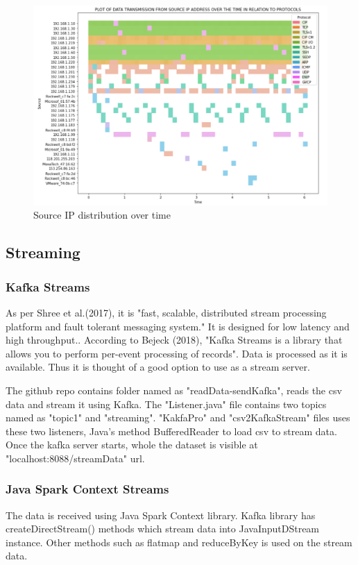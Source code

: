\documentclass{article}
\begin{document}
\begin{figure}[h!]
\centering
\includegraphics[scale=0.55]{source_time.PNG}
\caption{Source IP distribution over time}
\label{fig:universe}
\end{figure}

\subsection{Streaming}

\subsubsection{Kafka Streams}

As per Shree et al.(2017), it is "fast, scalable, distributed stream processing platform and fault tolerant messaging system." It is designed for low latency and high throughput.\cite{shree}. According to Bejeck (2018), "Kafka Streams is a library that allows you to perform per-event processing of records". Data is processed as it is available. Thus it is thought of a good option to use as a stream server.

The github repo contains folder named as "readData-sendKafka", reads the csv data and stream it using Kafka. The "Listener.java" file contains two topics named as "topic1" and "streaming". "KakfaPro" and "csv2KafkaStream" files uses these two listeners, Java's method BufferedReader to load csv to stream data. Once the kafka server starts, whole the dataset is visible at "localhost:8088/streamData" url.

\subsubsection{Java Spark Context Streams}
The data is received using Java Spark Context library. Kafka library has createDirectStream() methods which stream data into JavaInputDStream instance. Other methods such as flatmap and reduceByKey is used on the stream data.
\end{document}
